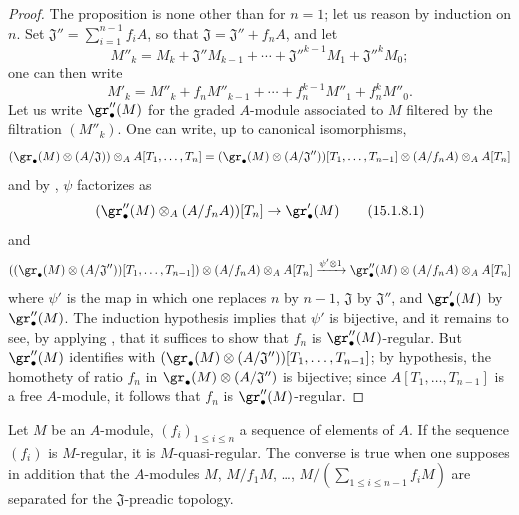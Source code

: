 \begin{proof}
The proposition is none other than  for $n=1$;
let us reason by induction on $n$.
Set $\mathfrak{J}''=\sum_{i=1}^{n-1}f_iA$, so that $\mathfrak{J}=\mathfrak{J}''+f_nA$, and let
\[
  M''_k = M_k+\mathfrak{J}''M_{k-1}+\cdots+\mathfrak{J}''^{k-1}M_1+\mathfrak{J}''^kM_0;
\]
one can then write
\[
  M'_k = M''_k + f_nM''_{k-1}+\cdots+f_n^{k-1}M''_1+f_n^kM''_0.
\]
Let us write $\gr''_\bullet(M)$ for the graded $A$-module associated to $M$ filtered by the filtration $(M''_k)$.
One can write, up to canonical isomorphisms,
\[
  (\gr_\bullet(M)\otimes(A/\mathfrak{J}))\otimes_A A[T_1,\ldots,T_n]
  = (\gr_\bullet(M)\otimes(A/\mathfrak{J}''))[T_1,\ldots,T_{n-1}]\otimes(A/f_nA)\otimes_A A[T_n]
\]
and by , $\psi$ factorizes as
\[
\label{0.15.1.8.1}
  (\gr''_\bullet(M)\otimes_A(A/f_nA))[T_n] \to \gr'_\bullet(M)
\tag{15.1.8.1}
\]
and
\[
  ((\gr_\bullet(M)\otimes(A/\mathfrak{J}''))[T_1,\ldots,T_{n-1}])\otimes(A/f_nA)\otimes_A A[T_n]
  \xrightarrow{\psi'\otimes 1} \gr''_\bullet(M)\otimes(A/f_nA)\otimes_A A[T_n]
\]
where $\psi'$ is the map  in which one replaces $n$ by $n-1$, $\mathfrak{J}$ by $\mathfrak{J}''$, and $\gr'_\bullet(M)$ by $\gr''_\bullet(M)$.
The induction hypothesis implies that $\psi'$ is bijective, and it remains to see, by applying , that it suffices to show that $f_n$ is $\gr''_\bullet(M)$-regular.
But $\gr''_\bullet(M)$ identifies with $(\gr_\bullet(M)\otimes(A/\mathfrak{J}''))[T_1,\ldots,T_{n-1}]$;
by hypothesis, the homothety of ratio $f_n$ in $\gr_\bullet(M)\otimes(A/\mathfrak{J}'')$ is bijective;
since $A[T_1,\ldots,T_{n-1}]$ is a free $A$-module, it follows that $f_n$ is $\gr''_\bullet(M)$-regular.
\end{proof}

\begin{proposition}[15.1.9]
\label{0.15.1.9}
Let $M$ be an $A$-module, $(f_i)_{1\leq i\leq n}$ a sequence of elements of $A$.
If the sequence $(f_i)$ is $M$-regular, it is $M$-quasi-regular.
The converse is true when one supposes in addition that the $A$-modules $M$, $M/f_1M$, \ldots, $M/(\sum_{1\leq i\leq n-1}f_iM)$ are separated for the $\mathfrak{J}$-preadic topology.
\end{proposition}

